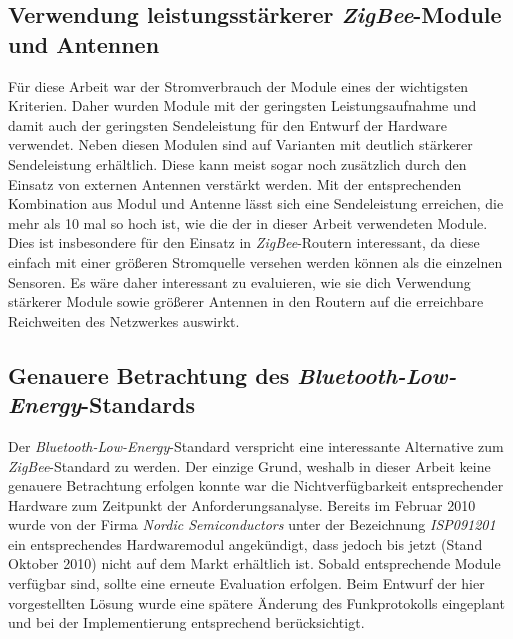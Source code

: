 \subsection{Verwendung leistungsstärkerer \emph{ZigBee}-Module und Antennen}
Für diese Arbeit war der Stromverbrauch der Module eines der wichtigsten Kriterien. Daher wurden Module mit der geringsten
Leistungsaufnahme und damit auch der geringsten Sendeleistung für den Entwurf der Hardware verwendet. Neben diesen
Modulen sind auf Varianten mit deutlich stärkerer Sendeleistung erhältlich. Diese kann meist sogar noch zusätzlich durch
den Einsatz von externen Antennen verstärkt werden. Mit der entsprechenden Kombination aus Modul und Antenne lässt sich eine
Sendeleistung erreichen, die mehr als 10 mal so hoch ist, wie die der in dieser Arbeit verwendeten Module. Dies ist 
insbesondere für den Einsatz in \emph{ZigBee}-Routern interessant, da diese einfach mit einer größeren Stromquelle versehen
werden können als die einzelnen Sensoren. Es wäre daher interessant zu evaluieren, wie sie dich Verwendung stärkerer Module
sowie größerer Antennen in den Routern auf die erreichbare Reichweiten des Netzwerkes auswirkt.

\subsection{Genauere Betrachtung des \emph{Bluetooth-Low-Energy}-Standards}
Der \emph{Bluetooth-Low-Energy}-Standard verspricht eine interessante Alternative zum \emph{ZigBee}-Standard zu werden.
Der einzige Grund, weshalb in dieser Arbeit keine genauere Betrachtung erfolgen konnte war die Nichtverfügbarkeit
entsprechender Hardware zum Zeitpunkt der Anforderungsanalyse. Bereits im Februar 2010 wurde von der Firma 
\emph{Nordic Semiconductors} unter der Bezeichnung \emph{ISP091201} ein entsprechendes Hardwaremodul angekündigt,
dass jedoch bis jetzt (Stand Oktober 2010) nicht auf dem Markt erhältlich ist. Sobald entsprechende Module verfügbar
sind, sollte eine erneute Evaluation erfolgen. Beim Entwurf der hier vorgestellten Lösung wurde eine spätere Änderung
des Funkprotokolls eingeplant und bei der Implementierung entsprechend berücksichtigt.
